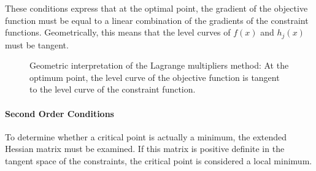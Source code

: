 These conditions express that at the optimal point, the gradient of the objective function must be equal to a linear combination of the gradients of the constraint functions. Geometrically, this means that the level curves of $f(x)$ and $h_j(x)$ must be tangent.

\begin{figure}
\centering
{}
\caption{Geometric interpretation of the Lagrange multipliers method: At the optimum point, the level curve of the objective function is tangent to the level curve of the constraint function.}
\label{fig:lagrange_geometry}
\end{figure}

\paragraph{Second Order Conditions}
To determine whether a critical point is actually a minimum, the extended Hessian matrix must be examined. If this matrix is positive definite in the tangent space of the constraints, the critical point is considered a local minimum.


